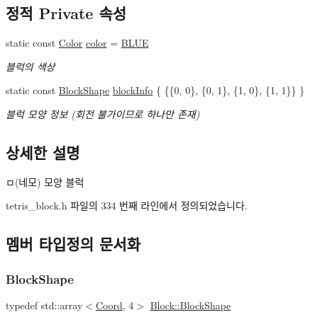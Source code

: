 \subsection*{정적 Private 속성}
\begin{DoxyCompactItemize}
\item 
static const \mbox{\hyperlink{class_block_ad054b4ac51df79aa910040b2a2fdf7b5}{Color}} \mbox{\hyperlink{class_o_a7005197d577eee8429ccaee14749e800}{color}} = \mbox{\hyperlink{class_block_ad054b4ac51df79aa910040b2a2fdf7b5a770f3d9456df6e3e286c001f0ffc835f}{B\+L\+UE}}
\begin{DoxyCompactList}\small\item\em 블럭의 색상 \end{DoxyCompactList}\item 
static const \mbox{\hyperlink{class_block_aca5d951639f113e2ebd7856209d6b9ab}{Block\+Shape}} \mbox{\hyperlink{class_o_aff83495bf15903121bea8f8c5d7f2a11}{block\+Info}} \{ \{\{0, 0\}, \{0, 1\}, \{1, 0\}, \{1, 1\}\} \}
\begin{DoxyCompactList}\small\item\em 블럭 모양 정보 (회전 불가이므로 하나만 존재) \end{DoxyCompactList}\end{DoxyCompactItemize}


\subsection{상세한 설명}
ㅁ(네모) 모양 블럭 

tetris\+\_\+block.\+h 파일의 334 번째 라인에서 정의되었습니다.



\subsection{멤버 타입정의 문서화}
\mbox{\label{class_block_aca5d951639f113e2ebd7856209d6b9ab}} 
\subsubsection{\texorpdfstring{Block\+Shape}{BlockShape}}
{\footnotesize\ttfamily typedef std\+::array$<$\mbox{\hyperlink{struct_coord}{Coord}}, 4$>$ \mbox{\hyperlink{class_block_aca5d951639f113e2ebd7856209d6b9ab}{Block\+::\+Block\+Shape}}\hspace{0.3cm}{\ttfamily [inherited]}}



